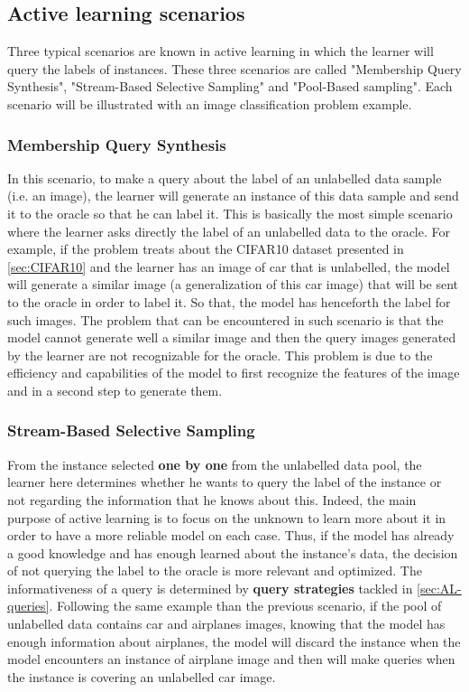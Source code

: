 \documentclass[11pt, openany]{report}
\theoremstyle{plain}
\theoremstyle{definition}
\theoremstyle{remark}
\begin{document}
\subsection{Active learning scenarios}

Three typical scenarios are known in active learning in which the learner will query the labels of instances. These three scenarios are called "Membership Query Synthesis", "Stream-Based Selective Sampling" and "Pool-Based sampling". Each scenario will be illustrated with an image classification problem example. 

\subsubsection{Membership Query Synthesis}
In this scenario, to make a query about the label of an unlabelled data sample (i.e. an image), the learner will generate an instance of this data sample and send it to the oracle so that he can label it. This is basically the most simple scenario where the learner asks directly the label of an unlabelled data to the oracle. For example, if the problem treats about the CIFAR10 dataset presented in \autoref{sec:CIFAR10} and the learner has an image of car that is unlabelled, the model will generate a similar image (a generalization of this car image) that will be sent to the oracle in order to label it. So that, the model has henceforth the label for such images. The problem that can be encountered in such scenario is that the model cannot generate well a similar image and then the query images generated by the learner are not recognizable for the oracle. This problem is due to the efficiency and capabilities of the model to first recognize the features of the image and in a second step to generate them.   


\subsubsection{Stream-Based Selective Sampling}
From the instance selected \textbf{one by one} from the unlabelled data pool, the learner here determines whether he wants to query the label of the instance or not regarding the information that he knows about this. Indeed, the main purpose of active learning is to focus on the unknown to learn more about it in order to have a more reliable model on each case. Thus, if the model has already a good knowledge and has enough learned about the instance's data, the decision of not querying the label to the oracle is more relevant and optimized. The informativeness of a query is determined by \textbf{query strategies} tackled in \autoref{sec:AL-queries}. Following the same example than the previous scenario, if the pool of unlabelled data contains car and airplanes images, knowing that the model has enough information about airplanes, the model will discard the instance when the model encounters an instance of airplane image and then will make queries when the instance is covering an unlabelled car image.    
\end{document}
